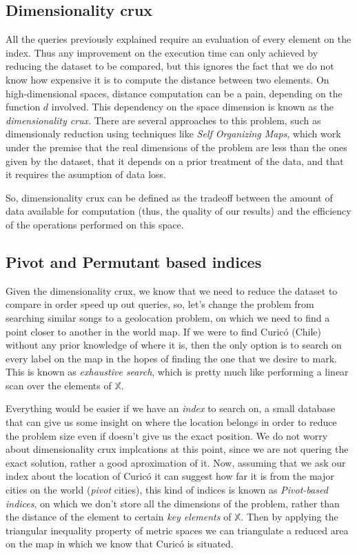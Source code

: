 \subsection{Dimensionality crux}
All the queries previously explained require an evaluation of every element on the index. Thus any improvement on
the execution time can only achieved by reducing the dataset to be compared, but this ignores the fact that we do not know
how expensive it is to compute the distance between two elements. On high-dimensional spaces, distance computation can be a pain,
depending on the function $d$ involved. This dependency on the space dimension is known as the \emph{dimensionality crux}. There are 
several approaches to this problem, such as dimensionaly reduction using techniques like \emph{Self Organizing Maps}, which work
under the premise that the real dimensions of the problem are less than the ones given by the dataset, that it depends on a
prior treatment of the data, and that it requires the asumption of data loss.

So, dimensionality crux can be defined as the tradeoff between the amount of data available for computation (thus, the quality of our results) and
the efficiency of the operations performed on this space.

\subsection{Pivot and Permutant based indices}
Given the dimensionality crux, we know that we need to reduce the dataset to compare in order speed up out queries, so, let's change the problem from
searching similar songs to a geolocation problem, on which we need to find a point closer to another in the world map. If we were to
find Curicó (Chile) without any prior knowledge of where it is, then the only option is to search on every label on the map
in the hopes of finding the one that we desire to mark. This is known as \emph{exhaustive search}, which is pretty much like performing a 
linear scan over the elements of $\mathbb{X}$.

Everything would be easier if we have an \emph{index} to search on, a small database that can give us some insight on where
the location belongs in order to reduce the problem size even if doesn't give us the exact position. We do not worry about dimensionality crux
implcations at this point, since we are not quering the exact solution, rather a good aproximation of it. Now, assuming that we ask
our index about the location of Curicó it can suggest how far it is from the major cities on the world (\emph{pivot} cities), this kind of indices
is known as \emph{Pivot-based indices}, on which we don't store all the dimensions of the problem, rather than the distance of the element to certain
\emph{key elements} of $\mathbb{X}$. Then by applying the triangular inequality property of metric spaces we can triangulate a reduced
area on the map in which we know that Curicó is situated.

